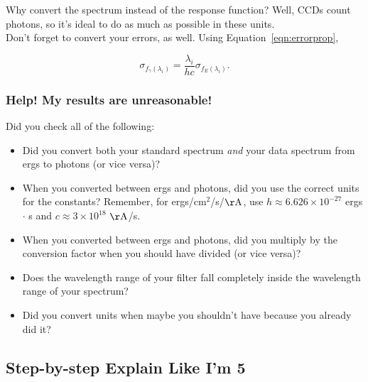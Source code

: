 Why convert the spectrum instead of the response function? Well, CCDs count photons, so it's ideal to do as much as possible in these units. \\

Don't forget to convert your errors, as well. Using Equation~\ref{eqn:errorprop},

\begin{equation}
    \sigma_{f_{\gamma}(\lambda_{i})} = \frac{\lambda_{i}}{hc}\sigma_{f_{E}(\lambda_{i})}.
\end{equation}

\subsubsection{Help! My results are unreasonable!}

Did you check all of the following:
\begin{itemize}
    \item Did you convert both your standard spectrum \textit{and} your data spectrum from ergs to photons (or vice versa)?
    \item When you converted between ergs and photons, did you use the correct units for the constants? Remember, for ergs/cm$^{2}$/s/$\mathrm{\AA}$, use $h \approx 6.626 \times 10^{-27}$ ergs $\cdot$ s and $c \approx 3\times 10^{18}$ $\mathrm{\AA}$/s. 
    \item When you converted between ergs and photons, did you multiply by the conversion factor when you should have divided (or vice versa)? 
    \item Does the wavelength range of your filter fall completely inside the wavelength range of your spectrum? 
    \item Did you convert units when maybe you shouldn't have because you already did it? 
\end{itemize}

\subsection{Step-by-step Explain Like I'm 5}